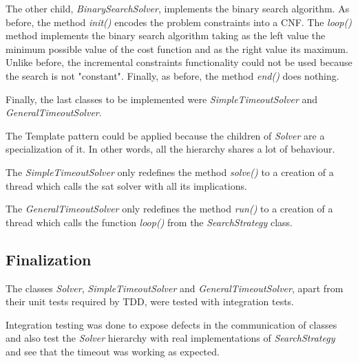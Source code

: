 The other child, \emph{BinarySearchSolver}, implements the binary search algorithm. As before, the method \emph{init()} encodes the problem constraints into a CNF. The \emph{loop()} method implements the binary search algorithm taking as the left value the minimum possible value of the cost function and as the right value its maximum. Unlike before, the incremental constraints functionality could not be used because the search is not "constant".  Finally, as before, the method \emph{end()} does nothing.  



Finally, the last classes to be implemented were \emph{SimpleTimeoutSolver} and \emph{GeneralTimeoutSolver}. 

The Template pattern 
could be applied because the children of \emph{Solver} are a specialization of it. In other words, all the hierarchy shares a lot of behaviour.  

The \emph{SimpleTimeoutSolver} only redefines the method \emph{solve()} to a creation of a thread which calls the sat solver with all its implications. 

The \emph{GeneralTimeoutSolver} only redefines the method \emph{run()} to a creation of a thread which calls the function \emph{loop()} from the \emph{SearchStrategy} class.  

\subsection{Finalization}
The classes \emph{Solver}, \emph{SimpleTimeoutSolver} and \emph{GeneralTimeoutSolver}, apart from their unit tests required by TDD, were tested with integration tests.  




Integration testing was done to expose defects in the communication of classes and also test the \emph{Solver} hierarchy with real implementations of \emph{SearchStrategy} and see that the timeout was working as expected. 

